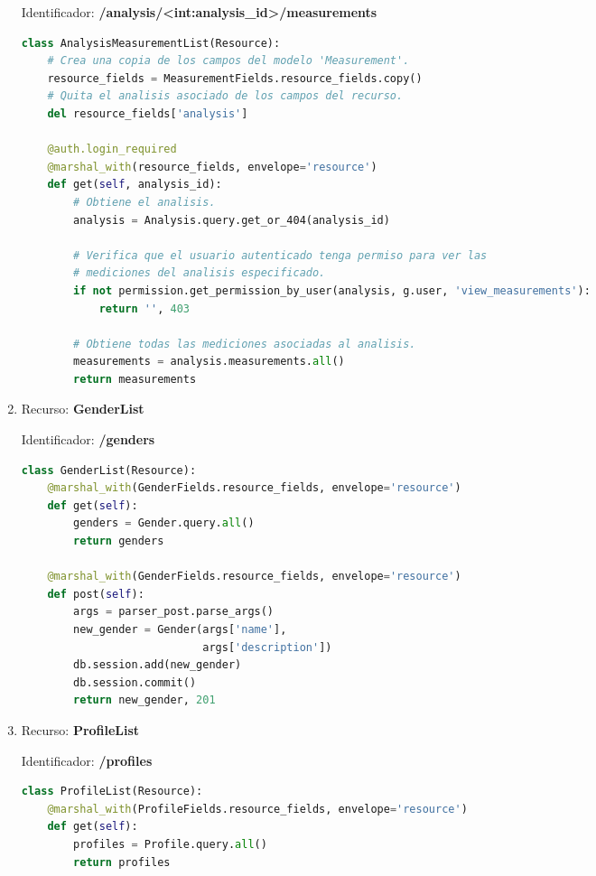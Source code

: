 \documentclass[a4paper,12pt]{article}
\begin{document}
\begin{enumerate}
Identificador: \textbf{/analysis/<int:analysis\_id>/measurements}

\begin{lstlisting}[language=Python]
class AnalysisMeasurementList(Resource):
    # Crea una copia de los campos del modelo 'Measurement'.
    resource_fields = MeasurementFields.resource_fields.copy()
    # Quita el analisis asociado de los campos del recurso.
    del resource_fields['analysis']
    
    @auth.login_required
    @marshal_with(resource_fields, envelope='resource')
    def get(self, analysis_id):
        # Obtiene el analisis.
        analysis = Analysis.query.get_or_404(analysis_id)

        # Verifica que el usuario autenticado tenga permiso para ver las
        # mediciones del analisis especificado.
        if not permission.get_permission_by_user(analysis, g.user, 'view_measurements'):
            return '', 403

        # Obtiene todas las mediciones asociadas al analisis.
        measurements = analysis.measurements.all()
        return measurements
\end{lstlisting}

\item Recurso: \textbf{GenderList}

Identificador: \textbf{/genders}

\begin{lstlisting}[language=Python]
class GenderList(Resource):
    @marshal_with(GenderFields.resource_fields, envelope='resource')
    def get(self):
        genders = Gender.query.all()
        return genders

    @marshal_with(GenderFields.resource_fields, envelope='resource')
    def post(self):
        args = parser_post.parse_args()
        new_gender = Gender(args['name'],
                            args['description'])
        db.session.add(new_gender)
        db.session.commit()
        return new_gender, 201
\end{lstlisting}

\item Recurso: \textbf{ProfileList}

Identificador: \textbf{/profiles}

\begin{lstlisting}[language=Python]
class ProfileList(Resource):
    @marshal_with(ProfileFields.resource_fields, envelope='resource')
    def get(self):
        profiles = Profile.query.all()
        return profiles


\end{lstlisting}
\end{enumerate}
\end{document}
